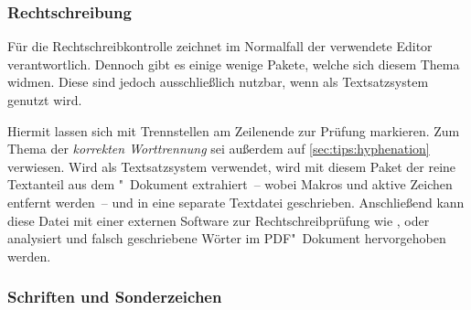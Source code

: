 \subsubsection{%
  Rechtschreibung%
}

Für die Rechtschreibkontrolle zeichnet im Normalfall der verwendete Editor 
verantwortlich. Dennoch gibt es einige wenige Pakete, welche sich diesem Thema 
widmen. Diese sind jedoch ausschließlich nutzbar, wenn als Textsatzsystem 
 genutzt wird.

\begin{DeclarePackages}[Rechtschreibung]
  Hiermit lassen sich mit  Trennstellen am Zeilenende zur 
  Prüfung markieren. Zum Thema der \textit{korrekten Worttrennung} sei außerdem 
  auf \autoref{sec:tips:hyphenation} verwiesen.
  Wird  als Textsatzsystem verwendet, wird mit diesem Paket 
  der reine Textanteil aus dem "~Dokument extrahiert~-- wobei 
  Makros und aktive Zeichen entfernt werden~-- und in eine separate Textdatei 
  geschrieben. Anschließend kann diese Datei mit einer externen Software zur  
  Rechtschreibprüfung wie ,  oder 
   analysiert und falsch geschriebene Wörter im 
  PDF"~Dokument hervorgehoben werden.
\end{DeclarePackages}



\subsubsection{Schriften und Sonderzeichen}

